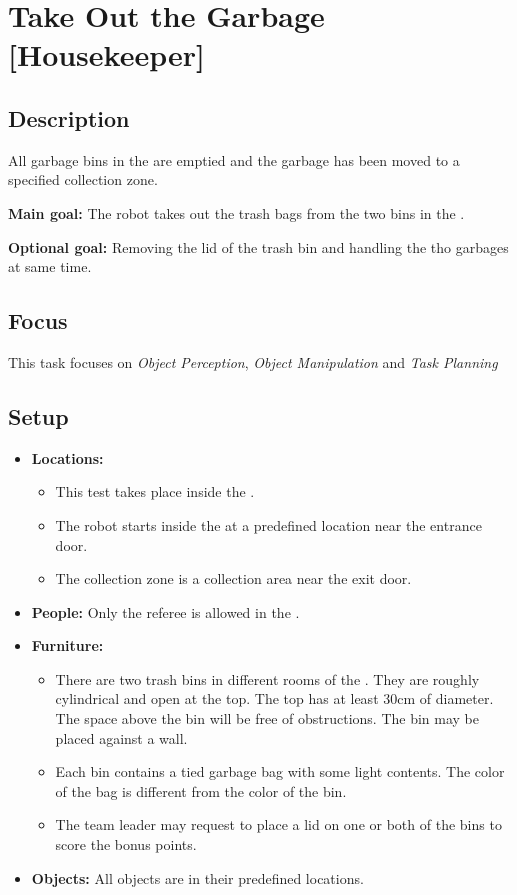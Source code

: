 \section{Take Out the Garbage [Housekeeper]}
\label{test:take-out-the-garbage}

\subsection*{Description}
	All garbage bins in the \Arena{} are emptied and the garbage has been moved to a specified collection zone.

\textbf{Main goal:}
	The robot takes out the trash bags from the two bins in the \Arena{}.

\textbf{Optional goal:}
	Removing the lid of the trash bin and handling the tho garbages at same time.

\subsection*{Focus}
	This task focuses on 
	\textit{Object Perception},
	\textit{Object Manipulation} and
	\textit{Task Planning}

\subsection*{Setup}
\begin{itemize}[nosep]	
	\item \textbf{Locations:}
		\begin{itemize}
			\item This test takes place inside the \Arena{}.
			\item The robot starts inside the \Arena{} at a predefined location near the entrance door.
			\item The collection zone is a collection area near the exit door.
		\end{itemize}
	\item \textbf{People:} Only the referee is allowed in the \Arena{}.
	\item \textbf{Furniture:} 
		\begin{itemize}
			\item There are two trash bins in different rooms of the \Arena{}. They are roughly cylindrical and open at the top. The top has at least 30cm of diameter. The space above the bin will be free of obstructions. The bin may be placed against a wall.
			\item Each bin contains a tied garbage bag with some light contents. The color of the bag is different from the color of the bin.
			\item The team leader may request to place a lid on one or both of the bins to score the bonus points.
		\end{itemize}
	\item \textbf{Objects:} All objects are in their predefined locations.
\end{itemize}

